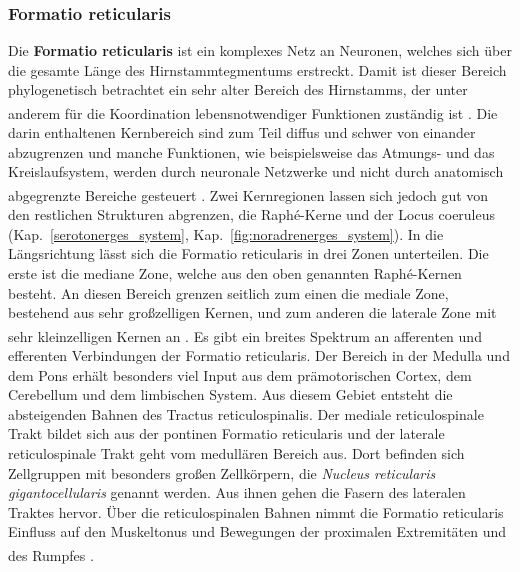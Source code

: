 \documentclass[12pt,a4paper,pdftex]{article}
\begin{document}
\subsubsection*{Formatio reticularis} 
Die \textbf{Formatio reticularis} ist ein komplexes Netz an Neuronen, welches sich über die gesamte Länge des Hirnstammtegmentums erstreckt. Damit ist dieser Bereich phylogenetisch betrachtet ein sehr alter Bereich des Hirnstamms, der unter anderem für die Koordination lebensnotwendiger Funktionen zuständig ist \textsuperscript{\cite[6]{trepel2011neuroanatomie}}. Die darin enthaltenen Kernbereich sind zum Teil diffus und schwer von einander abzugrenzen und manche Funktionen, wie beispielsweise das Atmungs- und das Kreislaufsystem, werden durch neuronale Netzwerke und nicht durch anatomisch abgegrenzte Bereiche gesteuert \textsuperscript{\cite[9]{crossman2014neuroanatomy}}. Zwei Kernregionen lassen sich jedoch gut von den restlichen Strukturen abgrenzen, die Raphé-Kerne und der Locus coeruleus (Kap.~\ref{serotonerges_system}, Kap.~\ref{fig:noradrenerges_system}). In die Längsrichtung lässt sich die Formatio reticularis in drei Zonen unterteilen. Die erste ist die mediane Zone, welche aus den oben genannten Raphé-Kernen besteht. An diesen Bereich grenzen seitlich zum einen die mediale Zone, bestehend aus sehr großzelligen Kernen, und zum anderen die laterale Zone mit sehr kleinzelligen Kernen an \textsuperscript{\cite[6]{trepel2011neuroanatomie}}. Es gibt ein breites Spektrum an afferenten und efferenten Verbindungen der Formatio reticularis. Der Bereich in der Medulla und dem Pons erhält besonders viel Input aus dem prämotorischen Cortex, dem Cerebellum und dem limbischen System. Aus diesem Gebiet entsteht die absteigenden Bahnen des Tractus reticulospinalis. Der mediale reticulospinale Trakt bildet sich aus der pontinen Formatio reticularis und der laterale reticulospinale Trakt geht vom medullären Bereich aus. Dort befinden sich Zellgruppen mit besonders großen Zellkörpern, die \textit{Nucleus reticularis gigantocellularis} genannt werden. Aus ihnen gehen die Fasern des lateralen Traktes hervor. Über die reticulospinalen Bahnen nimmt die Formatio reticularis Einfluss auf den Muskeltonus und Bewegungen der proximalen Extremitäten und des Rumpfes \textsuperscript{\cite[9]{crossman2014neuroanatomy}}.
\end{document}
